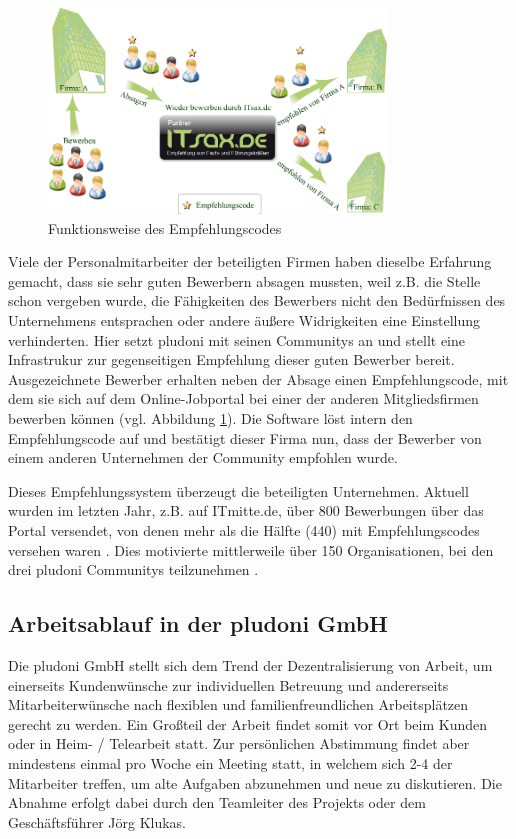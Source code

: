 \begin{figure}[htbp]
 \centering
 \includegraphics[width=0.8\textwidth]{./material/empfehlungscode.png}
 \caption{Funktionsweise des Empfehlungscodes}
 \label{fig:empfehlung}
\end{figure}
Viele der Personalmitarbeiter der beteiligten Firmen haben dieselbe Erfahrung gemacht, dass sie sehr guten Bewerbern absagen mussten, weil z.B. die Stelle schon vergeben wurde, die Fähigkeiten des Bewerbers nicht den Bedürfnissen des Unternehmens entsprachen oder andere äußere Widrigkeiten eine Einstellung verhinderten. Hier setzt pludoni mit seinen Communitys an und stellt eine Infrastrukur zur gegenseitigen Empfehlung dieser guten Bewerber bereit.  Ausgezeichnete Bewerber erhalten neben der Absage einen Empfehlungscode, mit dem sie sich auf dem Online-Jobportal bei einer der anderen Mitgliedsfirmen bewerben können (vgl. Abbildung \ref{fig:empfehlung}). Die Software löst intern den Empfehlungscode auf und bestätigt dieser Firma nun, dass der Bewerber von einem anderen Unternehmen der Community empfohlen wurde.

Dieses Empfehlungssystem überzeugt die beteiligten Unternehmen. Aktuell wurden im letzten Jahr, z.B. auf ITmitte.de, über 800 Bewerbungen über das Portal versendet, von denen mehr als die Hälfte (440) mit Empfehlungscodes versehen waren \citep{joerg_klukas_startseite_2011}. Dies motivierte mittlerweile über 150 Organisationen, bei den drei pludoni Communitys teilzunehmen \citep{joerg_klukas_referenzen_2011}.

\subsection{Arbeitsablauf in der pludoni GmbH}
\label{sec:arbeitsablauf}
Die pludoni GmbH stellt sich dem Trend der Dezentralisierung von Arbeit, um einerseits Kundenwünsche zur individuellen Betreuung und andererseits Mitarbeiterwünsche nach flexiblen und familienfreundlichen Arbeitsplätzen gerecht zu werden. Ein Großteil der Arbeit findet somit vor Ort beim Kunden oder in Heim- / Telearbeit statt.
Zur persönlichen Abstimmung findet aber mindestens einmal pro Woche ein Meeting statt, in welchem sich 2-4 der Mitarbeiter treffen, um alte Aufgaben abzunehmen und neue zu diskutieren. Die Abnahme erfolgt dabei durch den Teamleiter des Projekts oder dem Geschäftsführer Jörg Klukas.

